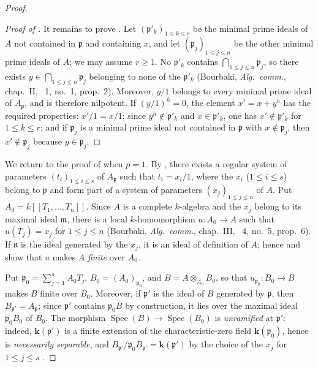 \begin{proof}
\begin{proof}[Proof of ]
It remains to prove . Let $(\mathfrak{p}'_k)_{1\leq k\leq r}$ be the minimal prime ideals of $A$ not contained in $\mathfrak{p}$ and containing $x$, and let $(\mathfrak{p}_j)_{1\leq j\leq n}$ be the other minimal prime ideals of $A$; we may assume $r\geq1$. No $\mathfrak{p}'_k$ contains $\bigcap_{1\leq j\leq n}\mathfrak{p}_j$, so there exists
$y\in\bigcap_{1\leq j\leq n}\mathfrak{p}_j$ belonging to none of the $\mathfrak{p}'_k$ (Bourbaki, \emph{Alg.\ comm.}, chap.~II, \textsection~1, no.~1, prop.~2). Moreover, $y/1$ belongs to every minimal prime ideal of $A_{\mathfrak{p}}$, and is therefore nilpotent. If $(y/1)^h=0$, the element $x'=x+y^h$ has the required properties: $x'/1=x/1$; since $y^h\notin\mathfrak{p}'_k$ and $x\in\mathfrak{p}'_k$, one has $x'\notin\mathfrak{p}'_k$ for $1\leq k\leq r$; and if $\mathfrak{p}_j$ is a minimal prime ideal not contained in $\mathfrak{p}$ with $x\notin\mathfrak{p}_j$, then $x'\notin\mathfrak{p}_j$ because $y\in\mathfrak{p}_j$.
\end{proof}

We return to the proof of  when $p=1$. By , there exists a regular system of parameters $(t_i)_{1\leq i\leq s}$ of $A_{\mathfrak{p}}$ such that $t_i=x_i/1$, where the $x_i$ ($1\leq i\leq s$) belong to $\mathfrak{p}$ and form part of a system of parameters $(x_j)_{1\leq j\leq n}$ of $A$. Put $A_0=k[[T_1,\ldots,T_n]]$. Since $A$ is a complete $k$-algebra and the $x_j$ belong to its maximal ideal $\mathfrak{m}$, there is a local $k$-homomorphism $u:A_0\to A$ such that $u(T_j)=x_j$ for $1\leq j\leq n$ (Bourbaki, \emph{Alg.\ comm.}, chap.~III, \textsection~4, no.~5, prop.~6). If $\mathfrak{n}$ is the ideal generated by the $x_j$, it is an ideal of definition of $A$; hence  and  show that $u$ makes $A$ \emph{finite} over $A_0$.

Put $\mathfrak{p}_0=\sum_{j=1}^{s}A_0T_j$, $B_0=(A_0)_{\mathfrak{p}_0}$, and $B=A\otimes_{A_0}B_0$, so that $u_{\mathfrak{p}_0}:B_0\to B$ makes
$B$ finite over $B_0$. Moreover, if $\mathfrak{p}'$ is the ideal of $B$ generated by $\mathfrak{p}$, then $B_{\mathfrak{p}'}=A_{\mathfrak{p}}$; since $\mathfrak{p}'$ contains $\mathfrak{p}_0B$ by construction, it lies over the maximal ideal $\mathfrak{p}_0B_0$ of $B_0$. The morphism $\operatorname{Spec}(B)\to\operatorname{Spec}(B_0)$ is \emph{unramified} at $\mathfrak{p}'$: indeed, $\boldsymbol{k}(\mathfrak{p}')$ is a finite extension of the characteristic-zero field $\boldsymbol{k}(\mathfrak{p}_0)$, hence is \emph{necessarily separable}, and $B_{\mathfrak{p}'}/\mathfrak{p}_0B_{\mathfrak{p}'}=\boldsymbol{k}(\mathfrak{p}')$ by the choice of the $x_j$ for $1\leq j\leq s$ .


\end{proof}
